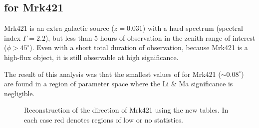 \documentclass[main.tex]{subfiles}
\begin{document}
\subsection{\rse for Mrk421}
Mrk421 is an extra-galactic source ($z=0.031$) with a hard spectrum (spectral index $\Gamma=2.2$), but less than 5 hours of observation in the zenith range of interest ($\phi>45^\circ$). Even with a short total duration of observation, because Mrk421 is a high-flux object, it is still observable at high significance.

The result of this analysis was that the smallest values of \rse for Mrk421 ($\sim 0.08^\circ$) are found in a region of parameter space where the Li \& Ma significance is negligible.

\begin{figure}[H]
  \begin{center}
  \end{center}
  \caption[Mrk421 direction reconstruction using Method5t.]{Reconstruction of the direction of Mrk421 using the new \disp tables. In each case red denotes regions of low or no statistics.}
  \label{fig:mrk_disp}
\end{figure}

\end{document}
